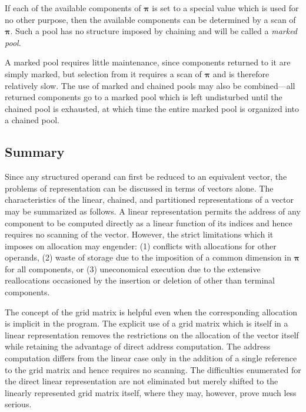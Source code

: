 \par If each of the available components of $\mathbf{π}$ is set to a special value which is used for no other purpose, then the available components can be determined by a scan of $\mathbf{π}$. Such a pool has no structure imposed by chaining and will be called a \textit{marked pool}.

\par A marked pool requires little maintenance, since components returned to it are simply marked, but selection from it requires a scan of $\mathbf{π}$ and is therefore relatively slow. The use of marked and chained pools may also be combined---all returned components go to a marked pool which is left undisturbed until the chained pool is exhausted, at which time the entire marked pool is organized into a chained pool.

\subsection*{Summary}

\par Since any structured operand can first be reduced to an equivalent vector, the problems of representation can be discussed in terms of vectors alone. The characteristics of the linear, chained, and partitioned representations of a vector may be summarized as follows. A linear representation permits the address of any component to be computed directly as a linear function of its indices and hence requires no scanning of the vector. However, the strict limitations which it imposes on allocation may engender: (1) conflicts with allocations for other operands, (2) waste of storage due to the imposition of a common dimension in $\mathbf{π}$ for all components, or (3) uneconomical execution due to the extensive reallocations occasioned by the insertion or deletion of other than terminal components.

\par The concept of the grid matrix is helpful even when the corresponding allocation is implicit in the program. The explicit use of a grid matrix which is itself in a linear representation removes the restrictions on the allocation of the vector itself while retaining the advantage of direct address computation. The address computation differs from the linear case only in the addition of a single reference to the grid matrix and hence requires no scanning. The difficulties enumerated for the direct linear representation are not eliminated but merely shifted to the linearly represented grid matrix itself, where they may, however, prove much less serious.

